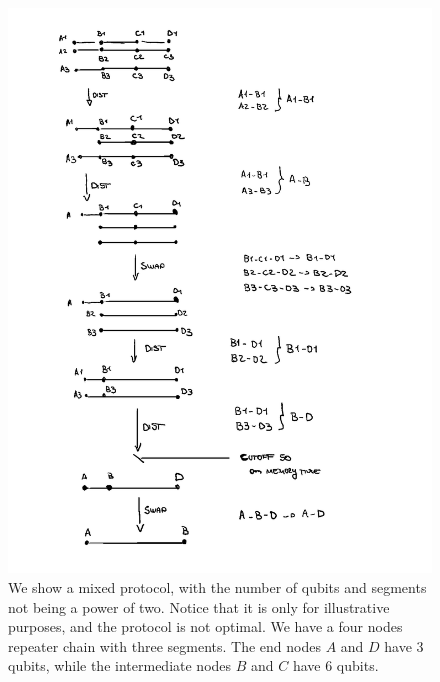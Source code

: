 \documentclass{masterthesis}
\begin{document}
\begin{figure}[ht]
    \centering
    \includegraphics[width=0.8\linewidth]{images/dist_example_sketch.png}
    \caption{We show a mixed protocol, with the number of qubits and segments not being a power of two. Notice that it is only for illustrative purposes, and the protocol is not optimal. We have a four nodes repeater chain with three segments. The end nodes $A$ and $D$ have 3 qubits, while the intermediate nodes $B$ and $C$ have 6 qubits.}
    \label{fig:mixed_protocol_sketch} 
\end{figure}
\end{document}
